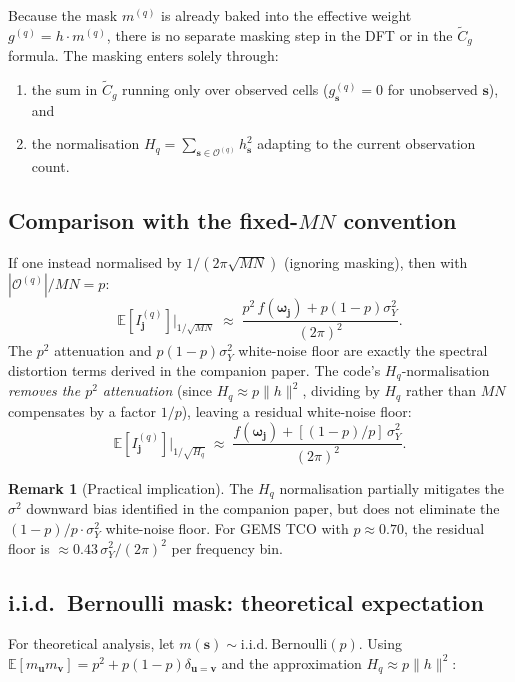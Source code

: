 \documentclass[12pt]{article}
\theoremstyle{definition}
\newtheorem{remark}{Remark}
\begin{document}
Because the mask $m^{(q)}$ is already baked into the effective weight
$g^{(q)} = h\cdot m^{(q)}$, there is no separate masking step in the
DFT or in the $\tilde{C}_g$ formula.
The masking enters solely through:
\begin{enumerate}
  \item the sum in $\tilde{C}_g$ running only over observed cells
        ($g^{(q)}_{\mathbf{s}} = 0$ for unobserved $\mathbf{s}$), and
  \item the normalisation $H_q = \sum_{\mathbf{s}\in\mathcal{O}^{(q)}}h_{\mathbf{s}}^2$
        adapting to the current observation count.
\end{enumerate}

\subsection{Comparison with the fixed-$MN$ convention}

If one instead normalised by $1/(2\pi\sqrt{MN})$ (ignoring masking),
then with $|\mathcal{O}^{(q)}|/MN = p$:
\[
  \mathbb{E}[I^{(q)}_{\mathbf{j}}]\big|_{1/\sqrt{MN}}
  \;\approx\; \frac{p^2\,f(\boldsymbol{\omega}_{\mathbf{j}}) + p(1-p)\sigma^2_Y}{(2\pi)^2}.
\]
The $p^2$ attenuation and $p(1-p)\sigma^2_Y$ white-noise floor are exactly
the spectral distortion terms derived in the companion paper.
The code's $H_q$-normalisation \emph{removes the $p^2$ attenuation}
(since $H_q \approx p\|h\|^2$, dividing by $H_q$ rather than $MN$
compensates by a factor $1/p$), leaving a residual white-noise floor:
\[
  \mathbb{E}[I^{(q)}_{\mathbf{j}}]\big|_{1/\sqrt{H_q}}
  \;\approx\; \frac{f(\boldsymbol{\omega}_{\mathbf{j}}) + [(1-p)/p]\,\sigma^2_Y}{(2\pi)^2}.
\]

\begin{remark}[Practical implication]
The $H_q$ normalisation partially mitigates the $\sigma^2$ downward bias
identified in the companion paper, but does not eliminate the
$(1-p)/p\cdot\sigma^2_Y$ white-noise floor.
For GEMS TCO with $p\approx 0.70$, the residual floor is
$\approx 0.43\,\sigma^2_Y/(2\pi)^2$ per frequency bin.
\end{remark}

\subsection{i.i.d.\ Bernoulli mask: theoretical expectation}

For theoretical analysis, let $m(\mathbf{s})\sim\mathrm{i.i.d.\ Bernoulli}(p)$.
Using $\mathbb{E}[m_\mathbf{u} m_\mathbf{v}] = p^2 + p(1-p)\delta_{\mathbf{u}=\mathbf{v}}$
and the approximation $H_q \approx p\|h\|^2$:
\end{document}
